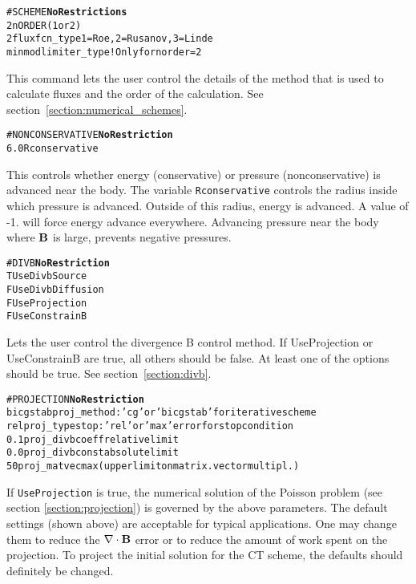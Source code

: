 \begin{alltt}
#SCHEME \hfill {\bf No Restrictions}
2                      nORDER (1 or 2)
2                      fluxfcn_type  1=Roe, 2=Rusanov, 3=Linde
minmod                 limiter_type ! Only for norder=2
\end{alltt}

This command lets the user control the details of the method that is used
to calculate fluxes and the order of the calculation.  See 
section~\ref{section:numerical_schemes}.
\ \ \\

\begin{alltt}
#NONCONSERVATIVE   \hfill    {\bf No Restriction}
6.0                    Rconservative
\end{alltt}

This controls whether energy (conservative) or pressure (nonconservative) is
advanced near the body.  The variable {\tt Rconservative} controls the radius
inside which pressure is advanced.  Outside of this radius, energy is advanced.
A value of -1. will force energy advance everywhere.  Advancing pressure near
the body where ${\bf B}$ is large, prevents negative pressures.
\ \ \\

\begin{alltt}
#DIVB     \hfill    {\bf No Restriction}
T                      UseDivbSource
F                      UseDivbDiffusion
F                      UseProjection
F                      UseConstrainB
\end{alltt}

Lets the user control the divergence B control method.
If UseProjection or UseConstrainB are true, all others should be false.
At least one of the options should be true.  See section~\ref{section:divb}.
\ \ \\

\begin{alltt}
#PROJECTION  \hfill  {\bf No Restriction}
bicgstab               proj_method:   'cg' or 'bicgstab' for iterative scheme
rel                    proj_typestop: 'rel' or 'max' error for stop condition
0.1                    proj_divbcoeff relative limit
0.0                    proj_divbconst absolute limit 
50                     proj_matvecmax	(upper limit on matrix.vector multipl.)
\end{alltt}

If {\tt UseProjection} is true, the numerical solution of the Poisson 
problem (see section \ref{section:projection}) is governed by the above parameters.
The default settings (shown above) are acceptable for typical applications.
One may change them to reduce the $\nabla\cdot\mathbf{B}$ error or to reduce
the amount of work spent on the projection. 
To project the initial solution for the CT scheme,
the defaults should definitely be changed.

